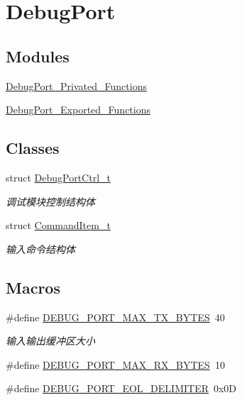 \hypertarget{group___debug_port}{}\section{Debug\+Port}
\label{group___debug_port}
\subsection*{Modules}
\begin{DoxyCompactItemize}
\item 
\hyperlink{group___debug_port___privated___functions}{Debug\+Port\+\_\+\+Privated\+\_\+\+Functions}
\item 
\hyperlink{group___debug_port___exported___functions}{Debug\+Port\+\_\+\+Exported\+\_\+\+Functions}
\end{DoxyCompactItemize}
\subsection*{Classes}
\begin{DoxyCompactItemize}
\item 
struct \hyperlink{struct_debug_port_ctrl__t}{Debug\+Port\+Ctrl\+\_\+t}
\begin{DoxyCompactList}\small\item\em 调试模块控制结构体 \end{DoxyCompactList}\item 
struct \hyperlink{struct_command_item__t}{Command\+Item\+\_\+t}
\begin{DoxyCompactList}\small\item\em 输入命令结构体 \end{DoxyCompactList}\end{DoxyCompactItemize}
\subsection*{Macros}
\begin{DoxyCompactItemize}
\item 
\#define \hyperlink{group___debug_port_ga9bca70c95e91f7f2057e7295dea5122e}{D\+E\+B\+U\+G\+\_\+\+P\+O\+R\+T\+\_\+\+M\+A\+X\+\_\+\+T\+X\+\_\+\+B\+Y\+T\+ES}~40
\begin{DoxyCompactList}\small\item\em 输入输出缓冲区大小 \end{DoxyCompactList}\item 
\#define \hyperlink{group___debug_port_ga43802773d24a869de1adfb0d0d869332}{D\+E\+B\+U\+G\+\_\+\+P\+O\+R\+T\+\_\+\+M\+A\+X\+\_\+\+R\+X\+\_\+\+B\+Y\+T\+ES}~10
\item 
\#define \hyperlink{group___debug_port_gacb83a29ae4e998016f337adf936d70cd}{D\+E\+B\+U\+G\+\_\+\+P\+O\+R\+T\+\_\+\+E\+O\+L\+\_\+\+D\+E\+L\+I\+M\+I\+T\+ER}~0x0D
\end{DoxyCompactItemize}
